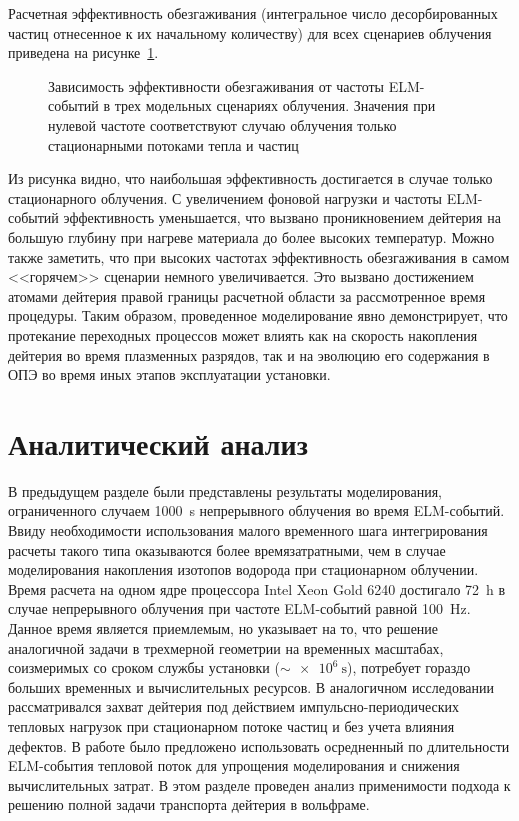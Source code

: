 Расчетная эффективность обезгаживания (интегральное число десорбированных частиц отнесенное к их начальному количеству) для всех сценариев облучения приведена на рисунке~\cref{fig:ch3/baking_efficiency}.
\begin{figure}[ht]
	\caption{Зависимость эффективности обезгаживания от частоты ELM-событий в трех модельных сценариях облучения. Значения при нулевой частоте соответствуют случаю облучения только стационарными потоками тепла и частиц}\label{fig:ch3/baking_efficiency}
\end{figure}
Из рисунка видно, что наибольшая эффективность достигается в случае только стационарного облучения. С увеличением фоновой нагрузки и частоты ELM-событий эффективность уменьшается, что вызвано проникновением дейтерия на большую глубину при нагреве материала до более высоких температур. Можно также заметить, что при высоких частотах эффективность обезгаживания в самом <<горячем>> сценарии немного увеличивается. Это вызвано достижением атомами дейтерия правой границы расчетной области за рассмотренное время процедуры. Таким образом, проведенное моделирование явно демонстрирует, что протекание переходных процессов может влиять как на скорость накопления дейтерия во время плазменных разрядов, так и на эволюцию его содержания в ОПЭ во время иных этапов эксплуатации установки. 

\section{Аналитический анализ}\label{sec:ch3/sec3}

В предыдущем разделе были представлены результаты моделирования, ограниченного случаем \SI{1000}{\second} непрерывного облучения во время ELM-событий. Ввиду необходимости использования малого временного шага интегрирования расчеты такого типа оказываются более времязатратными, чем в случае моделирования накопления изотопов водорода при стационарном облучении. Время расчета на одном ядре процессора Intel Xeon Gold 6240 достигало \SI{72}{\hour} в случае непрерывного облучения при частоте ELM-событий равной \SI{100}{\hertz}. Данное время является приемлемым, но указывает на то, что решение аналогичной задачи в трехмерной геометрии на временных масштабах, соизмеримых со сроком службы установки (\( \sim \SI{e6}{\second}\)), потребует гораздо больших временных и вычислительных ресурсов. В аналогичном исследовании~\cite{Dasgupta2023} рассматривался захват дейтерия под действием импульсно-периодических тепловых нагрузок при стационарном потоке частиц и без учета влияния дефектов. В работе было предложено использовать осредненный по длительности ELM-события тепловой поток для упрощения моделирования и снижения вычислительных затрат. В этом разделе проведен анализ применимости подхода к решению полной задачи транспорта дейтерия в вольфраме.

